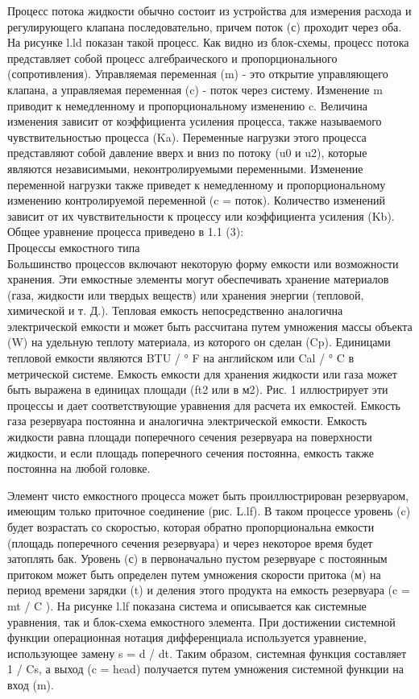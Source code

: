 \documentclass[aps,
12pt,
final,
oneside,
onecolumn,
musixtex, 
superscriptaddress,
centertags]{article}
\begin{document}
Процесс потока жидкости обычно состоит из устройства для измерения расхода и регулирующего клапана последовательно, причем поток (с) проходит через оба. На рисунке l.ld показан такой процесс. Как видно из блок-схемы, процесс потока представляет собой процесс алгебраического и пропорционального (сопротивления). Управляемая переменная (m) - это открытие управляющего клапана, а управляемая переменная (c) - поток через систему. Изменение m приводит к немедленному и пропорциональному изменению c. Величина изменения зависит от коэффициента усиления процесса, также называемого чувствительностью процесса (Ka). Переменные нагрузки этого процесса представляют собой давление вверх и вниз по потоку (u0 и u2), которые являются независимыми, неконтролируемыми переменными. Изменение переменной нагрузки также приведет к немедленному и пропорциональному изменению контролируемой переменной (c = поток). Количество изменений зависит от их чувствительности к процессу или коэффициента усиления (Kb).
Общее уравнение процесса приведено в 1.1 (3):\\

Процессы емкостного типа \\

Большинство процессов включают некоторую форму емкости или возможности хранения. Эти емкостные элементы могут обеспечивать хранение материалов (газа, жидкости или твердых веществ) или хранения энергии (тепловой, химической и т. Д.). Тепловая емкость непосредственно аналогична электрической емкости и может быть рассчитана путем умножения массы объекта (W) на удельную теплоту материала, из которого он сделан (Cp). Единицами тепловой емкости являются BTU / ° F на английском или Cal / ° C в метрической системе.
Емкость емкости для хранения жидкости или газа может быть выражена в единицах площади (ft2 или в м2). Рис. 1 иллюстрирует эти процессы и дает соответствующие уравнения для расчета их емкостей. Емкость газа резервуара постоянна и аналогична электрической емкости. Емкость жидкости равна площади поперечного сечения резервуара на поверхности жидкости, и если площадь поперечного сечения постоянна, емкость также постоянна на любой головке.

Элемент чисто емкостного процесса может быть проиллюстрирован резервуаром, имеющим только приточное соединение (рис. L.lf). В таком процессе уровень (c) будет возрастать со скоростью, которая обратно пропорциональна емкости (площадь поперечного сечения резервуара) и через некоторое время будет затоплять бак. Уровень (с) в первоначально пустом резервуаре с постоянным притоком может быть определен путем умножения скорости притока (м) на период времени зарядки (t) и деления этого продукта на емкость резервуара (c = mt / C ). На рисунке l.lf показана система и описывается как системные уравнения, так и блок-схема емкостного элемента. При достижении системной функции операционная нотация дифференциала
используется уравнение, использующее замену s = d / dt. Таким образом, системная функция составляет 1 / Cs, а выход (c = head) получается путем умножения системной функции на вход (m).
\end{document}
